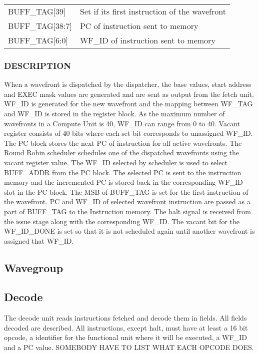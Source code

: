 \documentclass{article}
\begin{document}
\begin{tabular}{l p{4.5in}} 
  BUFF\_TAG[39] & Set if its first instruction of the wavefront \\
  BUFF\_TAG[38:7] & PC of instruction sent to memory \\
  BUFF\_TAG[6:0] & WF\_ID of instruction sent to memory \\
\end{tabular}

\subsubsection{DESCRIPTION}
When a wavefront is dispatched by the dispatcher, the base values, start address and EXEC mask values are generated and are sent as output from the fetch unit. WF\_ID is generated for the new wavefront and the mapping between WF\_TAG and WF\_ID is stored in the register block. As the maximum number of wavefronts in a Compute Unit is 40, WF\_ID can range from 0 to 40. Vacant register consists of 40 bits where each set bit corresponds to unassigned WF\_ID. The PC block stores the next PC of instruction for all active wavefronts. The Round Robin scheduler schedules one of the dispatched wavefronts using the vacant register value. The WF\_ID selected by scheduler is used to select BUFF\_ADDR from the PC block. The selected PC is sent to the instruction memory and the incremented PC is stored back in the corresponding WF\_ID slot in the PC block. The MSB of BUFF\_TAG is set for the first instruction of the wavefront. PC and WF\_ID of selected wavefront instruction are passed as a part of BUFF\_TAG to the Instruction memory. The halt signal is received from the issue stage along with the corresponding WF\_ID. The vacant bit for the WF\_ID\_DONE is set so that it is not scheduled again until another wavefront is assigned that WF\_ID.


\subsection{Wavegroup}

\subsection{Decode}
The decode unit reads instructions fetched and decode them in fields. All fields decoded are described. All instructions, except halt, must have at least a 16 bit opcode, a identifier for the functional unit where it will be executed, a WF\_ID and a PC value.
SOMEBODY HAVE TO LIST WHAT EACH OPCODE DOES.
\end{document}
